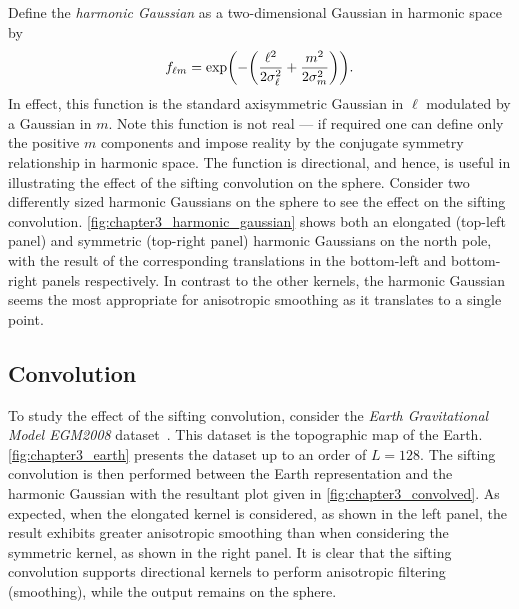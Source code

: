 Define the \emph{harmonic Gaussian} as a two-dimensional Gaussian in harmonic space by
%
\begin{equation}\label{eq:chapter3_harmonic_gaussian}
	{f}_{\ell m}
	= \exp(-\bigg(\frac{{\ell}^{2}}{2\sigma_{\ell}^{2}} + \frac{{m}^{2}}{2\sigma_{m}^{2}}\bigg)).
\end{equation}
%
In effect, this function is the standard axisymmetric Gaussian in \(\ell{}\) modulated by a Gaussian in \(m\).
Note this function is not real --- if required one can define only the positive \(m\) components and impose reality by the conjugate symmetry relationship in harmonic space.
The function is directional, and hence, is useful in illustrating the effect of the sifting convolution on the sphere.
Consider two differently sized harmonic Gaussians on the sphere to see the effect on the sifting convolution.
\cref{fig:chapter3_harmonic_gaussian} shows both an elongated (top-left panel) and symmetric (top-right panel) harmonic Gaussians on the north pole, with the result of the corresponding translations in the bottom-left and bottom-right panels respectively.
In contrast to the other kernels, the harmonic Gaussian seems the most appropriate for anisotropic smoothing as it translates to a single point.



\subsection{Convolution}\label{sec:chapter3_convolution}

To study the effect of the sifting convolution, consider the \emph{Earth Gravitational Model EGM2008} dataset~\cite{Pavlis2013}.
This dataset is the topographic map of the Earth.
\cref{fig:chapter3_earth} presents the dataset up to an order of \(L=128\).
The sifting convolution is then performed between the Earth representation and the harmonic Gaussian with the resultant plot given in \cref{fig:chapter3_convolved}.
As expected, when the elongated kernel is considered, as shown in the left panel, the result exhibits greater anisotropic smoothing than when considering the symmetric kernel, as shown in the right panel.
It is clear that the sifting convolution supports directional kernels to perform anisotropic filtering (smoothing), while the output remains on the sphere.





